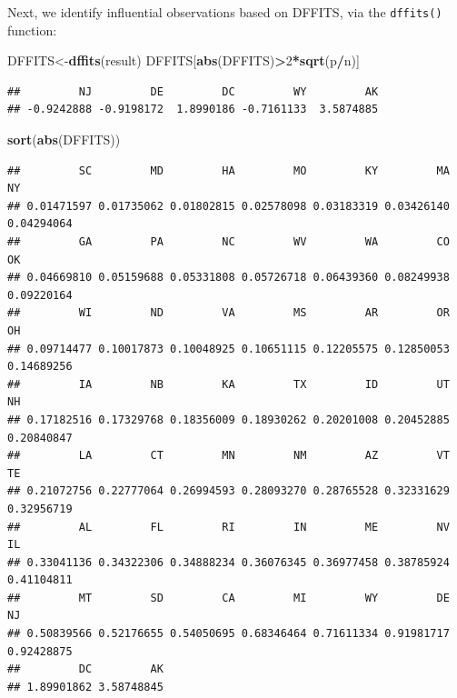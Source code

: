 \documentclass[
]{book}
\newenvironment{Shaded}{\begin{snugshade}}{\end{snugshade}}
\newcommand{\DecValTok}[1]{\textcolor[rgb]{0.00,0.00,0.81}{#1}}
\newcommand{\FunctionTok}[1]{\textcolor[rgb]{0.13,0.29,0.53}{\textbf{#1}}}
\newcommand{\NormalTok}[1]{#1}
\newcommand{\OtherTok}[1]{\textcolor[rgb]{0.56,0.35,0.01}{#1}}
\newcommand{\SpecialCharTok}[1]{\textcolor[rgb]{0.81,0.36,0.00}{\textbf{#1}}}
\begin{document}
Next, we identify influential observations based on DFFITS, via the \texttt{dffits()} function:

\begin{Shaded}
\begin{Highlighting}[]
\NormalTok{DFFITS}\OtherTok{\textless{}{-}}\FunctionTok{dffits}\NormalTok{(result)}
\NormalTok{DFFITS[}\FunctionTok{abs}\NormalTok{(DFFITS)}\SpecialCharTok{\textgreater{}}\DecValTok{2}\SpecialCharTok{*}\FunctionTok{sqrt}\NormalTok{(p}\SpecialCharTok{/}\NormalTok{n)]}
\end{Highlighting}
\end{Shaded}

\begin{verbatim}
##         NJ         DE         DC         WY         AK 
## -0.9242888 -0.9198172  1.8990186 -0.7161133  3.5874885
\end{verbatim}

\begin{Shaded}
\begin{Highlighting}[]
\FunctionTok{sort}\NormalTok{(}\FunctionTok{abs}\NormalTok{(DFFITS))}
\end{Highlighting}
\end{Shaded}

\begin{verbatim}
##         SC         MD         HA         MO         KY         MA         NY 
## 0.01471597 0.01735062 0.01802815 0.02578098 0.03183319 0.03426140 0.04294064 
##         GA         PA         NC         WV         WA         CO         OK 
## 0.04669810 0.05159688 0.05331808 0.05726718 0.06439360 0.08249938 0.09220164 
##         WI         ND         VA         MS         AR         OR         OH 
## 0.09714477 0.10017873 0.10048925 0.10651115 0.12205575 0.12850053 0.14689256 
##         IA         NB         KA         TX         ID         UT         NH 
## 0.17182516 0.17329768 0.18356009 0.18930262 0.20201008 0.20452885 0.20840847 
##         LA         CT         MN         NM         AZ         VT         TE 
## 0.21072756 0.22777064 0.26994593 0.28093270 0.28765528 0.32331629 0.32956719 
##         AL         FL         RI         IN         ME         NV         IL 
## 0.33041136 0.34322306 0.34888234 0.36076345 0.36977458 0.38785924 0.41104811 
##         MT         SD         CA         MI         WY         DE         NJ 
## 0.50839566 0.52176655 0.54050695 0.68346464 0.71611334 0.91981717 0.92428875 
##         DC         AK 
## 1.89901862 3.58748845
\end{verbatim}
\end{document}

